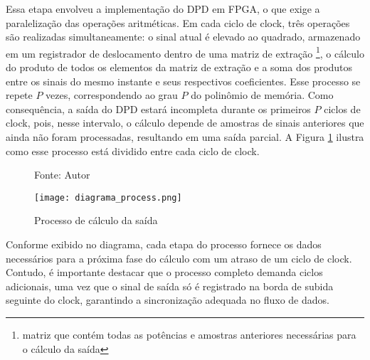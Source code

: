 Essa etapa envolveu a implementação do DPD em FPGA, o que exige a paralelização das operações aritméticas. Em cada ciclo de clock, três operações são realizadas simultaneamente: o sinal atual é elevado ao quadrado, armazenado em um registrador de deslocamento dentro de uma matriz de extração \footnote{matriz que contém todas as potências e amostras anteriores necessárias para o cálculo da saída}, o cálculo do produto de todos os elementos da matriz de extração e a soma dos produtos entre os sinais do mesmo instante e seus respectivos coeficientes. Esse processo se repete \( P \) vezes, correspondendo ao grau \( P \) do polinômio de memória. Como consequência, a saída do DPD estará incompleta durante os primeiros \( P \) ciclos de clock, pois, nesse intervalo, o cálculo depende de amostras de sinais anteriores que ainda não foram processadas, resultando em uma saída parcial.
A Figura \ref{fig:diagramaprocess} ilustra como esse processo está dividido entre cada ciclo de clock.

\begin{figure}[htbp!]
	\centering
	\captionsetup{justification=centering}
	\caption*{Fonte: Autor}
	\texttt{[image: diagrama\_process.png]}
	\caption{Processo de cálculo da saída}
	\label{fig:diagramaprocess}
\end{figure}
Conforme exibido no diagrama, cada etapa do processo fornece os dados necessários para a próxima fase do cálculo com um atraso de um ciclo de clock. Contudo, é importante destacar que o processo completo demanda ciclos adicionais, uma vez que o sinal de saída só é registrado na borda de subida seguinte do clock, garantindo a sincronização adequada no fluxo de dados.
